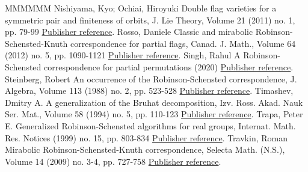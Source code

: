 \begin{thebibliography}{MMMMMM}
 Nishiyama, Kyo; Ochiai, Hiroyuki Double flag varieties for a symmetric pair and finiteness of orbits, J. Lie Theory, Volume 21 (2011) no. 1, pp. 79-99 \href{https://alco.centre-mersenne.org/articles/10.5802/alco.245/#NO}{Publisher reference}.
 Rosso, Daniele Classic and mirabolic Robinson-Schensted-Knuth correspondence for partial flags, Canad. J. Math., Volume 64 (2012) no. 5, pp. 1090-1121 \href{https://alco.centre-mersenne.org/articles/10.5802/alco.245/#Rosso}{Publisher reference}.
 Singh, Rahul A Robinson-Schensted correspondence for partial permutations (2020) \href{https://alco.centre-mersenne.org/articles/10.5802/alco.245/#Singh}{Publisher reference}.
 Steinberg, Robert An occurrence of the Robinson-Schensted correspondence, J. Algebra, Volume 113 (1988) no. 2, pp. 523-528 \href{https://alco.centre-mersenne.org/articles/10.5802/alco.245/#Steinberg-occurrence}{Publisher reference}.
 Timashev, Dmitry A. A generalization of the Bruhat decomposition, Izv. Ross. Akad. Nauk Ser. Mat., Volume 58 (1994) no. 5, pp. 110-123 \href{https://alco.centre-mersenne.org/articles/10.5802/alco.245/#Timashev}{Publisher reference}.
 Trapa, Peter E. Generalized Robinson-Schensted algorithms for real groups, Internat. Math. Res. Notices (1999) no. 15, pp. 803-834 \href{https://alco.centre-mersenne.org/articles/10.5802/alco.245/#Trapa-IMRN}{Publisher reference}.
 Travkin, Roman Mirabolic Robinson-Schensted-Knuth correspondence, Selecta Math. (N.S.), Volume 14 (2009) no. 3-4, pp. 727-758 \href{https://alco.centre-mersenne.org/articles/10.5802/alco.245/#Travkin}{Publisher reference}.
\end{thebibliography}
